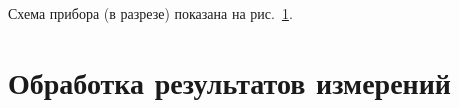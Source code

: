 \documentclass[12pt,a4paper]{article}
\begin{document}
	Схема прибора (в разрезе) показана на рис.~\ref{ris:ustanovka}.


\begin{figure}[h!]
	\label{ris:ustanovka}
\end{figure}

\newpage

\section{Обработка результатов измерений}
\end{document}
